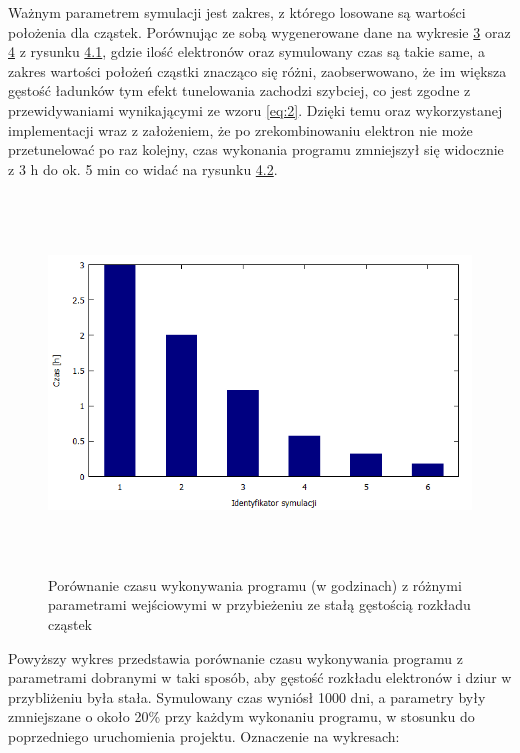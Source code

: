 Ważnym parametrem symulacji jest zakres, z którego losowane są wartości położenia dla cząstek. Porównując ze sobą wygenerowane dane na wykresie  \hyperref[wykres:1]{3} oraz \hyperref[wykres:2]{4} z rysunku \hyperref[rys:1]{4.1}, gdzie ilość elektronów oraz symulowany czas są takie same, a zakres wartości położeń cząstki znacząco się różni, zaobserwowano, że im większa gęstość ładunków tym efekt tunelowania zachodzi szybciej, co jest zgodne z przewidywaniami wynikającymi ze wzoru \ref{eq:2}. Dzięki temu oraz wykorzystanej implementacji wraz z założeniem, że po zrekombinowaniu elektron nie może przetunelować po raz kolejny, czas wykonania programu zmniejszył się widocznie z 3 h do ok. 5 min co widać na rysunku \hyperref[rys:2]{4.2}. 

\begin{figure}[H]
\centering
\includegraphics[width=17cm, height = 10cm]{czas_all}
\caption{Porównanie czasu wykonywania programu (w godzinach) z różnymi parametrami wejściowymi w przybieżeniu ze stałą gęstością rozkładu cząstek}
\label{rys:1}
\end{figure}

Powyższy wykres przedstawia porównanie czasu wykonywania programu z parametrami dobranymi w taki sposób, aby gęstość rozkładu elektronów i dziur  w przybliżeniu była stała. Symulowany czas wyniósł 1000 dni, a parametry były zmniejszane o około 20\% przy każdym wykonaniu programu, w stosunku do poprzedniego uruchomienia projektu. Oznaczenie na wykresach:

